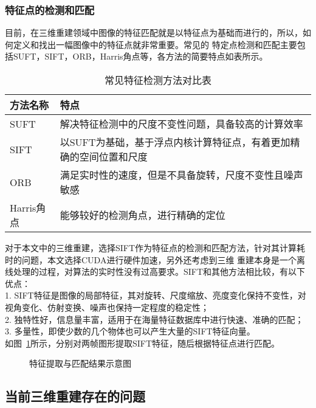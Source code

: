 \subsubsection{特征点的检测和匹配} 
\label{sec:3.2.2.1}
目前，在三维重建领域中图像的特征匹配就是以特征点为基础而进行的，所以，如何定义和找出一幅图像中的特征点就非常重要。常见的
特定点检测和匹配主要包括SUFT，SIFT，ORB，Harris角点等，各方法的简要特点如表所示。
\begin{table}[h]
    \centering
    \caption{常见特征检测方法对比表}
    \label{tab:Feature}
    \begin{tabular}{C{3.6cm}L{12.4cm}}
    \toprule
    \textbf{方法名称} & \textbf{特点}  \\
    \midrule
    SUFT&解决特征检测中的尺度不变性问题，具备较高的计算效率\\
    SIFT&以SUFT为基础，基于浮点内核计算特征点，有着更加精确的空间位置和尺度\\
    ORB&满足实时性的速度，但是不具备旋转，尺度不变性且噪声敏感\\
    Harris角点&能够较好的检测角点，进行精确的定位\\
    \bottomrule
    \end{tabular}
  \end{table}

对于本文中的三维重建，选择SIFT作为特征点的检测和匹配方法，针对其计算耗时的问题，本文选择CUDA进行硬件加速，另外还考虑到三维
重建本身是一个离线处理的过程，对算法的实时性没有过高要求。SIFT和其他方法相比较，有以下优点：\\
1. SIFT特征是图像的局部特征，其对旋转、尺度缩放、亮度变化保持不变性，对视角变化、仿射变换、噪声也保持一定程度的稳定性；\\
2. 独特性好，信息量丰富，适用于在海量特征数据库中进行快速、准确的匹配；\\
3. 多量性，即使少数的几个物体也可以产生大量的SIFT特征向量。\\
如图~\ref{fig:3Dconstrmatchresult}所示，分别对两帧图形提取SIFT特征，随后根据特征点进行匹配。

\begin{figure}[htbp]
    \centering
    \vskip0.5cm
    \caption{特征提取与匹配结果示意图}\label{fig:3Dconstrmatchresult}
  \end{figure}
\subsection{当前三维重建存在的问题}
\label{sec:3.2.3}

